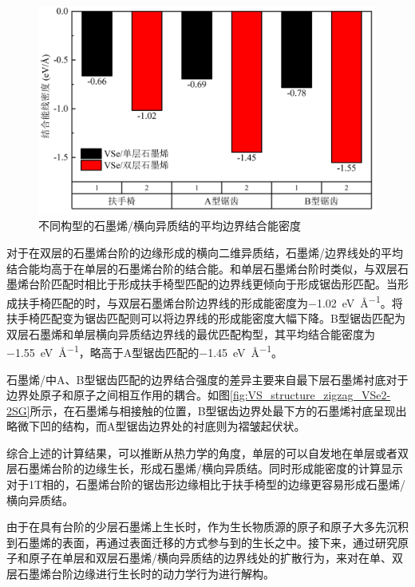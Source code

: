     \begin{figure}[htb]
        \includegraphics{pic/VS_DFT_VSe2-G_stepAndEdge.png}
        \caption{不同构型的石墨烯/横向异质结的平均边界结合能密度}
        \label{fig:VS_DFT_VSe2-G_stepAndEdge}
    \end{figure}

    对于在双层的石墨烯台阶的边缘形成的横向二维异质结，石墨烯/边界线处的平均结合能均高于在单层的石墨烯台阶的结合能。和单层石墨烯台阶时类似，与双层石墨烯台阶匹配时相比于形成扶手椅型匹配的边界线更倾向于形成锯齿形匹配。当形成扶手椅匹配的时，与双层石墨烯台阶边界线的形成能密度为\SI{-1.02}{\electronvolt\per\angstrom}。将扶手椅匹配变为锯齿匹配则可以将边界线的形成能密度大幅下降。B型锯齿匹配为双层石墨烯和单层横向异质结边界线的最优匹配构型，其平均结合能密度为\SI{-1.55}{\electronvolt\per\angstrom}，略高于A型锯齿匹配的\SI{-1.45}{\electronvolt\per\angstrom}。

    石墨烯/中A、B型锯齿匹配的边界结合强度的差异主要来自最下层石墨烯衬底对于边界处原子和原子之间相互作用的耦合。如图\ref{fig:VS_structure_zigzag_VSe2-2SG}所示，在石墨烯与相接触的位置，B型锯齿边界处最下方的石墨烯衬底呈现出略微下凹的结构，而A型锯齿边界处的衬底则为褶皱起伏状。

    综合上述的计算结果，可以推断从热力学的角度，单层的可以自发地在单层或者双层石墨烯台阶的边缘生长，形成石墨烯/横向异质结。同时形成能密度的计算显示对于1T相的，石墨烯台阶的锯齿形边缘相比于扶手椅型的边缘更容易形成石墨烯/横向异质结。

    由于在具有台阶的少层石墨烯上生长时，作为生长物质源的原子和原子大多先沉积到石墨烯的表面，再通过表面迁移的方式参与到的生长之中。接下来，通过研究原子和原子在单层和双层石墨烯/横向异质结的边界线处的扩散行为，来对在单、双层石墨烯台阶边缘进行生长时的动力学行为进行解构。

